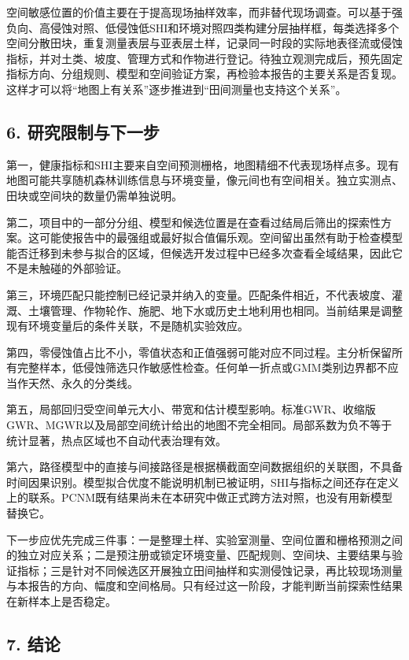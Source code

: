 \documentclass[
  10.5pt,
]{article}
\begin{document}
空间敏感位置的价值主要在于提高现场抽样效率，而非替代现场调查。可以基于强负向、高侵蚀对照、低侵蚀低SHI和环境对照四类构建分层抽样框，每类选择多个空间分散田块，重复测量表层与亚表层土样，记录同一时段的实际地表径流或侵蚀指标，并对土类、坡度、管理方式和作物进行登记。待独立观测完成后，预先固定指标方向、分组规则、模型和空间验证方案，再检验本报告的主要关系是否复现。这样才可以将``地图上有关系''逐步推进到``田间测量也支持这个关系''。

\hypertarget{ux7814ux7a76ux9650ux5236ux4e0eux4e0bux4e00ux6b65}{%
\subsection{6.
研究限制与下一步}\label{ux7814ux7a76ux9650ux5236ux4e0eux4e0bux4e00ux6b65}}

第一，健康指标和SHI主要来自空间预测栅格，地图精细不代表现场样点多。现有地图可能共享随机森林训练信息与环境变量，像元间也有空间相关。独立实测点、田块或空间块的数量仍需单独说明。

第二，项目中的一部分分组、模型和候选位置是在查看过结局后筛出的探索性方案。这可能使报告中的最强组或最好拟合值偏乐观。空间留出虽然有助于检查模型能否迁移到未参与拟合的区域，但候选开发过程中已经多次查看全域结果，因此它不是未触碰的外部验证。

第三，环境匹配只能控制已经记录并纳入的变量。匹配条件相近，不代表坡度、灌溉、土壤管理、作物轮作、施肥、地下水或历史土地利用也相同。当前结果是调整现有环境变量后的条件关联，不是随机实验效应。

第四，零侵蚀值占比不小，零值状态和正值强弱可能对应不同过程。主分析保留所有完整样本，低侵蚀筛选只作敏感性检查。任何单一折点或GMM类别边界都不应当作天然、永久的分类线。

第五，局部回归受空间单元大小、带宽和估计模型影响。标准GWR、收缩版GWR、MGWR以及局部空间统计给出的地图不完全相同。局部系数为负不等于统计显著，热点区域也不自动代表治理有效。

第六，路径模型中的直接与间接路径是根据横截面空间数据组织的关联图，不具备时间因果识别。模型拟合优度不能说明机制已被证明，SHI与指标之间还存在定义上的联系。PCNM既有结果尚未在本研究中做正式跨方法对照，也没有用新模型替换它。

下一步应优先完成三件事：一是整理土样、实验室测量、空间位置和栅格预测之间的独立对应关系；二是预注册或锁定环境变量、匹配规则、空间块、主要结果与验证指标；三是针对不同候选区开展独立田间抽样和实测侵蚀记录，再比较现场测量与本报告的方向、幅度和空间格局。只有经过这一阶段，才能判断当前探索性结果在新样本上是否稳定。

\hypertarget{ux7ed3ux8bba}{%
\subsection{7. 结论}\label{ux7ed3ux8bba}}
\end{document}
